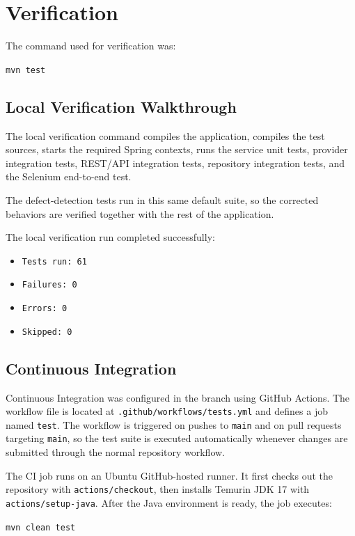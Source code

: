\chapter{Verification} \label{cap:verification}

The command used for verification was:

\texttt{mvn test}

\section{Local Verification Walkthrough}

The local verification command compiles the application, compiles the test sources, starts the required Spring contexts, runs the service unit tests, provider integration tests, REST/API integration tests, repository integration tests, and the Selenium end-to-end test.

The defect-detection tests run in this same default suite, so the corrected behaviors are verified together with the rest of the application.

The local verification run completed successfully:

\begin{itemize}
\item \texttt{Tests run: 61}
\item \texttt{Failures: 0}
\item \texttt{Errors: 0}
\item \texttt{Skipped: 0}
\end{itemize}

\section{Continuous Integration}
 
Continuous Integration was configured in the branch using GitHub Actions. The workflow file is located at \texttt{.github/workflows/tests.yml} and defines a job named \texttt{test}. The workflow is triggered on pushes to \texttt{main} and on pull requests targeting \texttt{main}, so the test suite is executed automatically whenever changes are submitted through the normal repository workflow.

The CI job runs on an Ubuntu GitHub-hosted runner. It first checks out the repository with \texttt{actions/checkout}, then installs Temurin JDK 17 with \texttt{actions/setup-java}. After the Java environment is ready, the job executes:

\texttt{mvn clean test}

